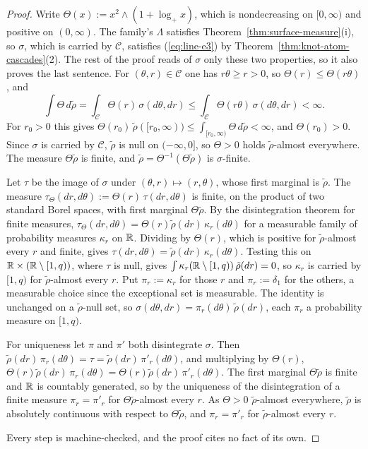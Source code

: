 \begin{proof}
Write $\Theta(x) := x^2 \wedge (1 + \log_+x)$, which is nondecreasing on $[0,\infty)$ and positive on
$(0,\infty)$. The family's $\Lambda$ satisfies Theorem~\ref{thm:surface-measure}(i), so $\sigma$,
which is carried by $\mathcal{C}$, satisfies (\ref{eq:line-e3}) by Theorem~\ref{thm:knot-atom-cascades}(2).
The rest of the proof reads of $\sigma$ only these two properties, so it also proves the last
sentence. For $(\theta, r) \in \mathcal{C}$ one has $r\theta \ge r > 0$, so $\Theta(r) \le \Theta(r\theta)$, and
\[
  \int \Theta\,d\tilde\rho = \int_{\mathcal{C}}\Theta(r)\,\sigma(d\theta,dr)
  \le \int_{\mathcal{C}}\Theta(r\theta)\,\sigma(d\theta,dr) < \infty .
\]
For $r_0 > 0$ this gives $\Theta(r_0)\,\tilde\rho([r_0,\infty)) \le \int_{[r_0,\infty)}\Theta\,d\tilde\rho < \infty$,
and $\Theta(r_0) > 0$. Since $\sigma$ is carried by $\mathcal{C}$, $\tilde\rho$ is null on $(-\infty,0]$,
so $\Theta > 0$ holds $\tilde\rho$-almost everywhere. The measure $\Theta\tilde\rho$ is finite, and
$\tilde\rho = \Theta^{-1}(\Theta\tilde\rho)$ is $\sigma$-finite.

Let $\tau$ be the image of $\sigma$ under $(\theta, r) \mapsto (r, \theta)$, whose first marginal
is $\tilde\rho$. The measure $\tau_\Theta(dr, d\theta) := \Theta(r)\,\tau(dr, d\theta)$ is finite, on the
product of two standard Borel spaces, with first marginal $\Theta\tilde\rho$. By the disintegration
theorem for finite measures, $\tau_\Theta(dr, d\theta) = \Theta(r)\tilde\rho(dr)\,\kappa_r(d\theta)$ for a
measurable family of probability measures $\kappa_r$ on $\mathbb{R}$. Dividing by $\Theta(r)$, which is positive
for $\tilde\rho$-almost every $r$ and finite, gives $\tau(dr, d\theta) = \tilde\rho(dr)\,\kappa_r(d\theta)$.
Testing this on $\mathbb{R} \times (\mathbb{R} \setminus [1,q))$, where $\tau$ is null, gives
$\int\kappa_r(\mathbb{R} \setminus [1,q))\,\tilde\rho(dr) = 0$, so $\kappa_r$ is carried by $[1,q)$ for
$\tilde\rho$-almost every $r$. Put $\pi_r := \kappa_r$ for those $r$ and $\pi_r := \delta_1$ for
the others, a measurable choice since the exceptional set is measurable. The identity is unchanged on
a $\tilde\rho$-null set, so $\sigma(d\theta, dr) = \pi_r(d\theta)\,\tilde\rho(dr)$, each $\pi_r$ a
probability measure on $[1,q)$.

For uniqueness let $\pi$ and $\pi'$ both disintegrate $\sigma$. Then
$\tilde\rho(dr)\,\pi_r(d\theta) = \tau = \tilde\rho(dr)\,\pi'_r(d\theta)$, and multiplying by $\Theta(r)$,
$\Theta(r)\tilde\rho(dr)\,\pi_r(d\theta) = \Theta(r)\tilde\rho(dr)\,\pi'_r(d\theta)$. The first marginal
$\Theta\tilde\rho$ is finite and $\mathbb{R}$ is countably generated, so by the uniqueness of the
disintegration of a finite measure $\pi_r = \pi'_r$ for $\Theta\tilde\rho$-almost every $r$. As $\Theta > 0$
$\tilde\rho$-almost everywhere, $\tilde\rho$ is absolutely continuous with respect to $\Theta\tilde\rho$,
and $\pi_r = \pi'_r$ for $\tilde\rho$-almost every $r$.

Every step is machine-checked, and the proof cites no fact of its own.
\end{proof}

